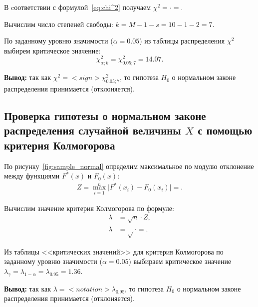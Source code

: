 \documentclass[14pt,hidelinks]{extarticle}
\begin{document}
В cоответствии с формулой~\eqref{eq:chi^2} получаем
$\chi^2=  \cdot  =  $.

Вычислим число степеней свободы: $ k = M - 1 - s = 10 - 1 - 2 = 7 $. 

По заданному уровню значимости ($\alpha = 0.05$) из таблицы распределения $\chi^2$ выбирем критическое значение:
\begin{equation*}
  \chi^2_{\alpha; k} = \chi^2_{0.05; 7} = 14.07.
\end{equation*}

\textbf{Вывод:} так как $\chi^2 =  {<}sign{>} \chi^2_{0.05;7} $, то гипотеза $H_0$ о нормальном законе распределения принимается (отклоняется). 


\subsection{Проверка гипотезы о нормальном законе распределения 
  случайной величины $ X $ с помощью критерия Колмогорова}

По рисунку~\ref{fig:sample_normal} определим максимальное по модулю отклонение между функциями $F^*(x)$ и $F_0(x)$:
\begin{align}
	Z = \max_{i=1}^n \Big| F^*(x_i) - F_0(x_i) \Big| = .
\end{align}

Вычислим значение критерия Колмогорова по формуле:
\begin{align}
  \lambda &= \sqrt{n} \cdot Z, \\ \nonumber
	\lambda &= \sqrt{} \cdot  = .
\end{align}

Из таблицы <<критических значений>> для критерия Колмогорова по заданному уровню значимости ($\alpha = 0.05$)
выбираем критическое значение $\lambda_{\gamma} = \lambda_{1-\alpha} = \lambda_{0.95} = 1.36 $.

\textbf{Вывод:} так как $\lambda =  {<}notation{>} \lambda_{0.95} $, то гипотеза $H_0$ о нормальном законе распределения принимается (отклоняется).
\end{document}
